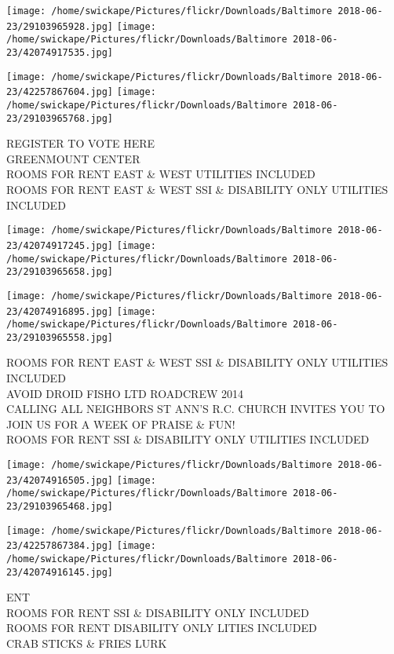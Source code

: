 \documentclass[10pt,letterpaper]{article}
\begin{document}
\texttt{[image: /home/swickape/Pictures/flickr/Downloads/Baltimore 2018-06-23/29103965928.jpg]}
\texttt{[image: /home/swickape/Pictures/flickr/Downloads/Baltimore 2018-06-23/42074917535.jpg]}

\texttt{[image: /home/swickape/Pictures/flickr/Downloads/Baltimore 2018-06-23/42257867604.jpg]}
\texttt{[image: /home/swickape/Pictures/flickr/Downloads/Baltimore 2018-06-23/29103965768.jpg]}

REGISTER TO VOTE HERE\\
GREENMOUNT CENTER\\
ROOMS FOR RENT EAST \& WEST UTILITIES INCLUDED\\
ROOMS FOR RENT EAST \& WEST SSI \& DISABILITY ONLY UTILITIES INCLUDED\\
\pagebreak

\texttt{[image: /home/swickape/Pictures/flickr/Downloads/Baltimore 2018-06-23/42074917245.jpg]}
\texttt{[image: /home/swickape/Pictures/flickr/Downloads/Baltimore 2018-06-23/29103965658.jpg]}

\texttt{[image: /home/swickape/Pictures/flickr/Downloads/Baltimore 2018-06-23/42074916895.jpg]}
\texttt{[image: /home/swickape/Pictures/flickr/Downloads/Baltimore 2018-06-23/29103965558.jpg]}

ROOMS FOR RENT EAST \& WEST SSI \& DISABILITY ONLY UTILITIES INCLUDED\\
AVOID DROID FISHO LTD ROADCREW 2014\\
CALLING ALL NEIGHBORS ST ANN'S R.C. CHURCH INVITES YOU TO JOIN US FOR A WEEK OF PRAISE \& FUN!\\
ROOMS FOR RENT SSI \& DISABILITY ONLY UTILITIES INCLUDED\\
\pagebreak

\texttt{[image: /home/swickape/Pictures/flickr/Downloads/Baltimore 2018-06-23/42074916505.jpg]}
\texttt{[image: /home/swickape/Pictures/flickr/Downloads/Baltimore 2018-06-23/29103965468.jpg]}

\texttt{[image: /home/swickape/Pictures/flickr/Downloads/Baltimore 2018-06-23/42257867384.jpg]}
\texttt{[image: /home/swickape/Pictures/flickr/Downloads/Baltimore 2018-06-23/42074916145.jpg]}

ENT\\
ROOMS FOR RENT SSI \& DISABILITY ONLY INCLUDED\\
ROOMS FOR RENT DISABILITY ONLY LITIES INCLUDED\\
CRAB STICKS \& FRIES LURK\\
\pagebreak
\end{document}
